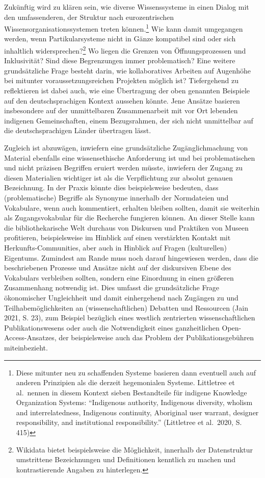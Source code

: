 \documentclass[a4paper,
fontsize=11pt,
oneside,
numbers=noperiodatend,
parskip=half-,
bibliography=totoc,
final
]{scrartcl}
\begin{document}
Zukünftig wird zu klären sein, wie diverse Wissenssysteme in einen
Dialog mit den umfassenderen, der Struktur nach eurozentrischen
Wissensorganisationssystemen treten können.\footnote{Diese mitunter neu
  zu schaffenden Systeme basieren dann eventuell auch auf anderen
  Prinzipien als die derzeit hegemonialen Systeme. Littletree et
  al.~nennen in diesem Kontext sieben Bestandteile für indigene
  Knowledge Organization Systems: \enquote{Indigenous authority,
  Indigenous diversity, wholism and interrelatedness, Indigenous
  continuity, Aboriginal user warrant, designer responsibility, and
  institutional responsibility.} (Littletree et al.~2020, S. 415)} Wie
kann damit umgegangen werden, wenn Partikularsysteme nicht in Gänze
kompatibel sind oder sich inhaltlich widersprechen?\footnote{Wikidata
  bietet beispielsweise die Möglichkeit, innerhalb der Datenstruktur
  umstrittene Bezeichnungen und Definitionen kenntlich zu machen und
  kontrastierende Angaben zu hinterlegen.} Wo liegen die Grenzen von
Öffnungsprozessen und Inklusivität? Sind diese Begrenzungen immer
problematisch? Eine weitere grundsätzliche Frage besteht darin, wie
kollaboratives Arbeiten auf Augenhöhe bei mitunter voraussetzungsreichen
Projekten möglich ist? Tiefergehend zu reflektieren ist dabei auch, wie
eine Übertragung der oben genannten Beispiele auf den deutschsprachigen
Kontext aussehen könnte. Jene Ansätze basieren insbesondere auf der
unmittelbaren Zusammenarbeit mit vor Ort lebenden indigenen
Gemeinschaften, einem Bezugsrahmen, der sich nicht unmittelbar auf die
deutschsprachigen Länder übertragen lässt.

Zugleich ist abzuwägen, inwiefern eine grundsätzliche Zugänglichmachung
von Material ebenfalls eine wissensethische Anforderung ist und bei
problematischen und nicht präzisen Begriffen eruiert werden müsste,
inwiefern der Zugang zu diesen Materialien wichtiger ist als die
Verpflichtung zur absolut genauen Bezeichnung. In der Praxis könnte dies
beispielsweise bedeuten, dass (problematische) Begriffe als Synonyme
innerhalb der Normdateien und Vokabulare, wenn auch kommentiert,
erhalten bleiben sollten, damit sie weiterhin als Zugangsvokabular für
die Recherche fungieren können. An dieser Stelle kann die
bibliothekarische Welt durchaus von Diskursen und Praktiken von Museen
profitieren, beispielsweise im Hinblick auf einen verstärkten Kontakt
mit Herkunfts-Communities, aber auch in Hinblick auf Fragen
(kulturellen) Eigentums. Zumindest am Rande muss noch darauf hingewiesen
werden, dass die beschriebenen Prozesse und Ansätze nicht auf der
diskursiven Ebene des Vokabulars verbleiben sollten, sondern eine
Einordnung in einen größeren Zusammenhang notwendig ist. Dies umfasst
die grundsätzliche Frage ökonomischer Ungleichheit und damit
einhergehend nach Zugängen zu und Teilhabemöglichkeiten an
(wissenschaftlichen) Debatten und Ressourcen (Jain 2021, S. 23), zum
Beispiel bezüglich eines westlich zentrierten wissenschaftlichen
Publikationswesens oder auch die Notwendigkeit eines ganzheitlichen
Open-Access-Ansatzes, der beispielsweise auch das Problem der
Publikationsgebühren miteinbezieht.
\end{document}
